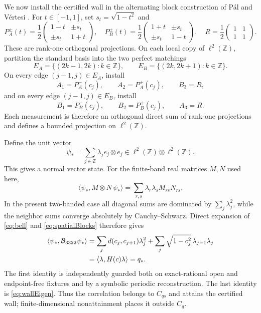 \documentclass[11pt]{article}
\newcommand{\B}{\mathcal B_{3322}}
\begin{document}
We now install the certified wall in the alternating block construction of
P\'al and V\'ertesi \cite{PalVertesi2010}.  For $t\in[-1,1]$, set
$s_t=\sqrt{1-t^2}$ and
\begin{equation}
P_A^\pm(t)=\frac12
\begin{pmatrix}1-t&\pm s_t\\ \pm s_t&1+t\end{pmatrix},\quad
P_B^\pm(t)=\frac12
\begin{pmatrix}1+t&\pm s_t\\ \pm s_t&1-t\end{pmatrix},\quad
R=\frac12\begin{pmatrix}1&1\\1&1\end{pmatrix}.   \label{eq:spatialBlocks}
\end{equation}
These are rank-one orthogonal projections.  On each local copy of
$\ell^2(\mathbb Z)$, partition the standard basis into the two perfect
matchings
\[
E_A=\{(2k-1,2k):k\in\mathbb Z\},\qquad
E_B=\{(2k,2k+1):k\in\mathbb Z\}.
\]
On every edge $(j-1,j)\in E_A$, install
\[
A_1=P_A^-(c_j),\qquad A_2=P_A^+(c_j),\qquad B_3=R,
\]
and on every edge $(j-1,j)\in E_B$, install
\[
B_1=P_B^-(c_j),\qquad B_2=P_B^+(c_j),\qquad A_3=R.
\]
Each measurement is therefore an orthogonal direct sum of rank-one
projections and defines a bounded projection on $\ell^2(\mathbb Z)$.

Define the unit vector
\begin{equation}
\psi_*=\sum_{j\in\mathbb Z}\lambda_j e_j\otimes e_j
\in\ell^2(\mathbb Z)\otimes\ell^2(\mathbb Z).      \label{eq:spatialState}
\end{equation}
This gives a normal vector state.  For the finite-band real matrices $M,N$
used here,
\[
\langle\psi_*,M\otimes N\,\psi_*\rangle
=\sum_{r,s}\lambda_r\lambda_s M_{rs}N_{rs}.
\]
In the present two-banded case all diagonal sums are dominated by
$\sum_j\lambda_j^2$, while the neighbor sums converge absolutely by
Cauchy--Schwarz.  Direct expansion of \eqref{eq:bell} and
\eqref{eq:spatialBlocks} therefore gives
\begin{align}
\langle\psi_*,\B\psi_*\rangle
&=\sum_j d(c_j,c_{j+1})\lambda_j^2
  +\sum_j\sqrt{1-c_j^2}\,\lambda_{j-1}\lambda_j \notag\\
&=\langle\lambda,H(c)\lambda\rangle=q_* .          \label{eq:spatialValue}
\end{align}
The first identity is independently guarded both on exact-rational open and
endpoint-free fixtures and by a symbolic periodic reconstruction.  The last
identity is \eqref{eq:wallEigen}.  Thus the correlation belongs to $C_{qs}$
and attains the certified wall; finite-dimensional nonattainment places it
outside $C_q$.
\end{document}
